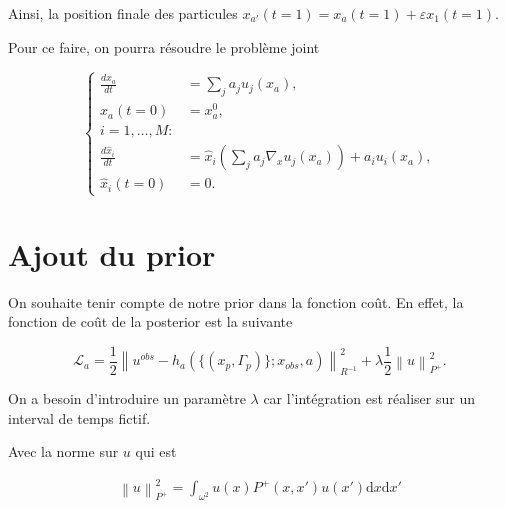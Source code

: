 \documentclass{article}
\newcommand{\norm}[1]{\left\lVert #1 \right\rVert}
\begin{document}
Ainsi, la position finale des particules $x_{a'}(t = 1) = x_{a}(t = 1) + \varepsilon x_1(t=1)$.

Pour ce faire, on pourra résoudre le problème joint

\begin{equation*}
    \begin{cases}
        \frac{dx_a}{dt}      & =  \sum_j a_j u_j(x_a),                                     \\
        x_a(t=0)             & =  x_a^0,                                                   \\
        i = 1, \dots, M:                                                                   \\
        \frac{d\hat x_i}{dt} & =  \hat x_i (\sum_j a_j  \nabla_x u_j(x_a)) + a_i u_i(x_a), \\
        \hat x_i(t=0)        & =  0.
    \end{cases}
\end{equation*}

\section{Ajout du prior}
On souhaite tenir compte de notre prior dans la fonction coût. En effet, la fonction de coût de la posterior est la suivante

\begin{equation*}
    \mathcal L_a =  \frac12 \norm{u^{obs} - h_a(\{(x_p, \Gamma_p)\}; x_{obs}, a)}^2_{R^{-1}} + \lambda \frac{1}{2} \norm{u}^2_{P^+}.
\end{equation*}

On a besoin d'introduire un paramètre $\lambda$ car l'intégration est réaliser sur un interval de temps fictif.

Avec la norme sur $u$ qui est

\begin{eqnarray*}
    \norm{u}^2_{P^+} = \int_{\omega^2} u(x) P^+(x, x') u(x') \mathrm{d}x\mathrm{d}x' \\
\end{eqnarray*}



\end{document}
